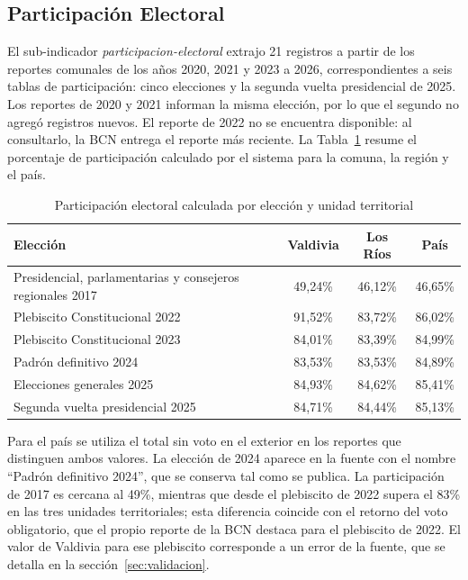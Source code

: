\documentclass[12pt,letterpaper,oneside]{report}
\begin{document}
\subsection{Participaci\'on Electoral}
\label{sec:resultado-sccp}

El sub-indicador \textit{participacion-electoral} extrajo 21 registros a partir de los reportes comunales de los a\~nos 2020, 2021 y 2023 a 2026, correspondientes a seis tablas de participaci\'on: cinco elecciones y la segunda vuelta presidencial de 2025. Los reportes de 2020 y 2021 informan la misma elecci\'on, por lo que el segundo no agreg\'o registros nuevos. El reporte de 2022 no se encuentra disponible: al consultarlo, la BCN entrega el reporte m\'as reciente. La Tabla~\ref{tab:participacion} resume el porcentaje de participaci\'on calculado por el sistema para la comuna, la regi\'on y el pa\'is.

\begin{table}[H]
\centering
\caption{Participaci\'on electoral calculada por elecci\'on y unidad territorial}
\label{tab:participacion}
\begin{tabular}{|p{6.4cm}|c|c|c|}
\hline
\textbf{Elecci\'on} & \textbf{Valdivia} & \textbf{Los R\'ios} & \textbf{Pa\'is} \\
\hline
Presidencial, parlamentarias y consejeros regionales 2017 & 49,24\% & 46,12\% & 46,65\% \\
\hline
Plebiscito Constitucional 2022 & 91,52\% & 83,72\% & 86,02\% \\
\hline
Plebiscito Constitucional 2023 & 84,01\% & 83,39\% & 84,99\% \\
\hline
Padr\'on definitivo 2024 & 83,53\% & 83,53\% & 84,89\% \\
\hline
Elecciones generales 2025 & 84,93\% & 84,62\% & 85,41\% \\
\hline
Segunda vuelta presidencial 2025 & 84,71\% & 84,44\% & 85,13\% \\
\hline
\end{tabular}
\end{table}

Para el pa\'is se utiliza el total sin voto en el exterior en los reportes que distinguen ambos valores. La elecci\'on de 2024 aparece en la fuente con el nombre ``Padr\'on definitivo 2024'', que se conserva tal como se publica. La participaci\'on de 2017 es cercana al 49\%, mientras que desde el plebiscito de 2022 supera el 83\% en las tres unidades territoriales; esta diferencia coincide con el retorno del voto obligatorio, que el propio reporte de la BCN destaca para el plebiscito de 2022. El valor de Valdivia para ese plebiscito corresponde a un error de la fuente, que se detalla en la secci\'on~\ref{sec:validacion}.
\end{document}
